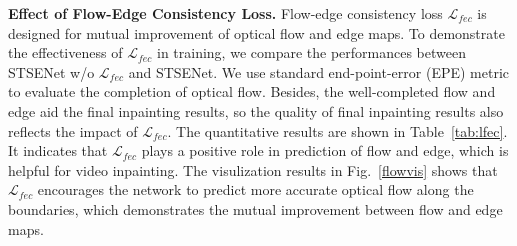 \noindent \textbf{Effect of Flow-Edge Consistency Loss.}
Flow-edge consistency loss $\mathcal{L}_{fec}$ is designed for mutual improvement of optical flow and edge maps.
To demonstrate the effectiveness of $\mathcal{L}_{fec}$ in training, we compare the performances between STSENet w/o $\mathcal{L}_{fec}$ and STSENet. We use standard end-point-error (EPE) metric to evaluate the completion of optical flow. Besides, the well-completed flow and edge aid the final inpainting results, so the quality of final inpainting results also reflects the impact of $\mathcal{L}_{fec}$.
The quantitative results are shown in Table~\ref{tab:lfec}. It indicates that $\mathcal{L}_{fec}$ plays a positive role in prediction of flow and edge, which is helpful for video inpainting. The visulization results in Fig.~\ref{flowvis} shows that $\mathcal{L}_{fec}$ encourages the network to predict more accurate optical flow along the boundaries, which demonstrates the mutual improvement between flow and edge maps.
\begin{table}[t]
	\caption{The effect of structure clues and temporal smoothening in STSENet. The mask number denotes the indexes of mask setting in the section Experimental Settings. We compare STI,STI w/o SEM, and  in three aspects of metrics.}\smallskip
	\centering
	\label{tab:edge}
\end{table}




